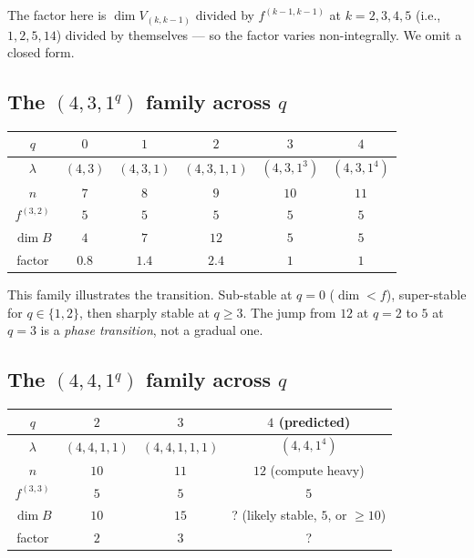 \documentclass[11pt]{article}
\theoremstyle{definition}
\begin{document}
The factor here is $\dim V_{(k, k-1)}$ divided by $f^{(k-1, k-1)}$ at
$k = 2, 3, 4, 5$ (i.e., $1, 2, 5, 14$) divided by themselves --- so
the factor varies non-integrally.  We omit a closed form.

\subsection{The $(4, 3, 1^q)$ family across $q$}

\begin{center}
\begin{tabular}{c|ccccc}
\toprule
$q$         & $0$ & $1$ & $2$ & $3$ & $4$ \\
\midrule
$\lambda$   & $(4,3)$ & $(4,3,1)$ & $(4,3,1,1)$ & $(4,3,1^3)$ & $(4,3,1^4)$ \\
$n$         & $7$     & $8$       & $9$         & $10$        & $11$ \\
$f^{(3,2)}$ & $5$     & $5$       & $5$         & $5$         & $5$ \\
$\dim B$    & $4$     & $7$       & $12$        & $5$         & $5$ \\
factor      & $0.8$   & $1.4$     & $2.4$       & $1$         & $1$ \\
\bottomrule
\end{tabular}
\end{center}

This family illustrates the transition.  Sub-stable at $q = 0$
($\dim < f$), super-stable for $q \in \{1, 2\}$, then sharply stable
at $q \ge 3$.  The jump from $12$ at $q = 2$ to $5$ at $q = 3$ is a
\emph{phase transition}, not a gradual one.

\subsection{The $(4, 4, 1^q)$ family across $q$}

\begin{center}
\begin{tabular}{c|ccc}
\toprule
$q$         & $2$ & $3$ & $4$ (predicted) \\
\midrule
$\lambda$   & $(4,4,1,1)$ & $(4,4,1,1,1)$ & $(4,4,1^4)$ \\
$n$         & $10$        & $11$          & $12$ (compute heavy) \\
$f^{(3,3)}$ & $5$         & $5$           & $5$ \\
$\dim B$    & $10$        & $15$          & ? (likely stable, $5$, or $\ge 10$) \\
factor      & $2$         & $3$           & ? \\
\bottomrule
\end{tabular}
\end{center}
\end{document}
